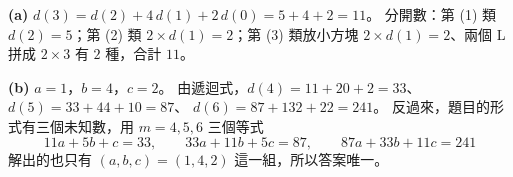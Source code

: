 \begin{pastsoln}
\textbf{(a)} $d(3) = d(2) + 4\,d(1) + 2\,d(0) = 5 + 4 + 2 = 11$。 分開數：第 (1) 類 $d(2) = 5$；第 (2) 類
$2 \times d(1) = 2$；第 (3) 類放小方塊 $2 \times d(1) = 2$、兩個 L 拼成 $2 \times 3$ 有 $2$ 種，合計 $11$。

\textbf{(b)} $a = 1$，$b = 4$，$c = 2$。 由遞迴式，$d(4) = 11 + 20 + 2 = 33$、$d(5) = 33 + 44 + 10 = 87$、
$d(6) = 87 + 132 + 22 = 241$。 反過來，題目的形式有三個未知數，用 $m = 4, 5, 6$ 三個等式
\[
11a + 5b + c = 33, \qquad 33a + 11b + 5c = 87, \qquad 87a + 33b + 11c = 241
\]
解出的也只有 $(a, b, c) = (1, 4, 2)$ 這一組，所以答案唯一。
\end{pastsoln}

